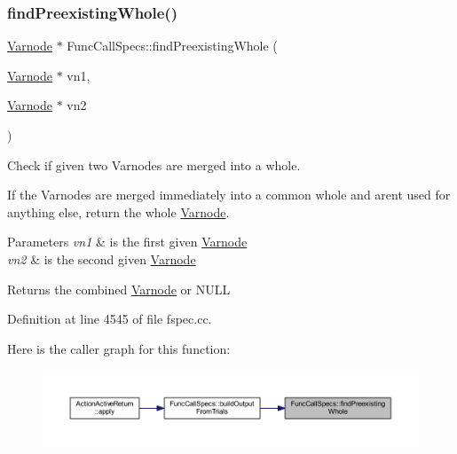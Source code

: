 \subsubsection{\texorpdfstring{findPreexistingWhole()}{findPreexistingWhole()}}
{\footnotesize\ttfamily \mbox{\hyperlink{class_varnode}{Varnode}} $\ast$ Func\+Call\+Specs\+::find\+Preexisting\+Whole (\begin{DoxyParamCaption}\item[{\mbox{\hyperlink{class_varnode}{Varnode}} $\ast$}]{vn1,  }\item[{\mbox{\hyperlink{class_varnode}{Varnode}} $\ast$}]{vn2 }\end{DoxyParamCaption})\hspace{0.3cm}{\ttfamily [static]}}



Check if given two Varnodes are merged into a whole. 

If the Varnodes are merged immediately into a common whole and aren\textquotesingle{}t used for anything else, return the whole \mbox{\hyperlink{class_varnode}{Varnode}}. 
\begin{DoxyParams}{Parameters}
{\em vn1} & is the first given \mbox{\hyperlink{class_varnode}{Varnode}} \\
\hline
{\em vn2} & is the second given \mbox{\hyperlink{class_varnode}{Varnode}} \\
\hline
\end{DoxyParams}
\begin{DoxyReturn}{Returns}
the combined \mbox{\hyperlink{class_varnode}{Varnode}} or N\+U\+LL 
\end{DoxyReturn}


Definition at line 4545 of file fspec.\+cc.

Here is the caller graph for this function\+:
\nopagebreak
\begin{figure}[H]
\begin{center}
\leavevmode
\includegraphics[width=350pt]{class_func_call_specs_a9a59b9321b66bc9f23e69d2ef729258c_icgraph}
\end{center}
\end{figure}
\mbox{\label{class_func_call_specs_a8bc0ef657c876530f21a6ae60458eb35}} 

